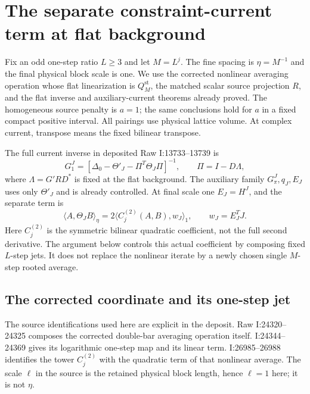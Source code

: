 
\section{The separate constraint-current term at flat background}
\label{fc-section}

Fix an odd one-step ratio $L\ge3$ and let $M=L^j$.
The fine spacing is $\eta=M^{-1}$ and the final physical block
scale is one. We use the corrected nonlinear averaging operation
whose flat linearization is $Q_M^{\mathrm{st}}$, the matched scalar
source projection $R$, and the flat inverse and auxiliary-current
theorems already proved. The homogeneous source penalty is $a=1$;
the same conclusions hold for $a$ in a fixed compact positive
interval. All pairings use physical lattice volume. At complex
current, transpose means the fixed bilinear transpose.

The full current inverse in deposited Raw I:13733--13739 is
\begin{equation}
 G_1^J=[\Delta_0-\Theta'_J-\Pi^T\Theta_J\Pi]^{-1},
 \qquad \Pi=I-D\Lambda,
 \label{fc-full-inverse-definition}
\end{equation}
where $\Lambda=G'RD^*$ is fixed at the flat background. The auxiliary
family $G_\pi^J,q_J,E_J$ uses only $\Theta'_J$ and is already
controlled. At final scale one $E_J=H^J$, and the separate term is
\begin{equation}
 \langle A,\Theta_J B\rangle_\eta
   =2\langle C_j^{(2)}(A,B),w_J\rangle_1,
 \qquad w_J=E_J^T J.
 \label{fc-constraint-form}
\end{equation}
Here $C_j^{(2)}$ is the symmetric bilinear quadratic coefficient,
not the full second derivative. The argument below controls this
actual coefficient by composing fixed $L$-step jets. It does not
replace the nonlinear iterate by a newly chosen single $M$-step
rooted average.

\subsection{The corrected coordinate and its one-step jet}
\label{fc-coordinate-section}

The source identifications used here are explicit in the deposit.
Raw I:24320--24325 composes the corrected double-bar averaging
operation itself. I:24344--24369 gives its logarithmic one-step
map and its linear term. I:26985--26988 identifies the tower
$C_j^{(2)}$ with the quadratic term of that nonlinear average.
The scale $\ell$ in the source is the retained physical block
length, hence $\ell=1$ here; it is not $\eta$.

